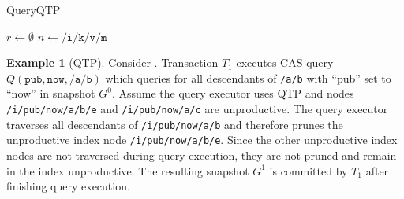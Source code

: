 \documentclass[abstracton,12pt]{scrartcl}
\theoremstyle{definition}
\newtheorem{example}{Example}
\begin{document}
\begin{algorithm}
  \caption{QueryQTP}
  \DontPrintSemicolon
  $r \longleftarrow \emptyset$\;
  $n \longleftarrow \texttt{/i/k/v/m}$\;
  \;
  \label{algo:query_qtp_wapi}
\end{algorithm}

\begin{example}[QTP]
  Consider . Transaction $T_1$ executes CAS query
  $Q(\texttt{pub},\texttt{now},\texttt{/a/b})$ which queries for all descendants
  of \texttt{/a/b} with ``pub'' set to ``now'' in snapshot $G^0$. Assume the
  query executor uses QTP and nodes \texttt{/i/pub/now/a/b/e} and
  \texttt{/i/pub/now/a/c} are unproductive. The
  query executor traverses all descendants of \texttt{/i/pub/now/a/b} and
  therefore prunes the unproductive index node \texttt{/i/pub/now/a/b/e}. Since
  the other unproductive index nodes are not traversed during query execution,
  they are not pruned and remain in the index unproductive. The resulting
  snapshot $G^1$ is committed by $T_1$ after finishing query execution.
\end{example}
\end{document}
